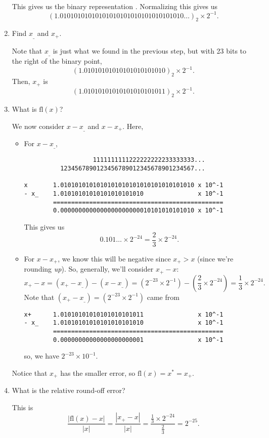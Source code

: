 \documentclass[letterpaper]{article}
\begin{document}
\begin{mdframed}
\begin{enumerate}[(1)]
\begin{mdframed}
\[\begin{aligned}
            \end{aligned}\]
            This gives us the binary representation . Normalizing this gives us 
            \[(1.01010101010101010101010101010101010\hdots)_2 \times 2^{-1}.\]
        \end{mdframed}
        \item Find $x_\_$ and $x_+$.
        \begin{mdframed}
            Note that $x_\_$ is just what we found in the previous step, but with 23 bits to the right of the binary point,
            \[(1.01010101010101010101010)_2 \times 2^{-1}.\]
            Then, $x_+$ is 
            \[(1.01010101010101010101011)_2 \times 2^{-1}.\] 
        \end{mdframed}
        \item What is $\text{fl}(x)$?
        \begin{mdframed}
            We now consider $x - x_\_$ and $x - x_+$. Here, 
            \begin{itemize}
                \item For $x - x_\_$, 
                \begin{verbatim}
                   1111111111222222222233333333...
          1234567890123456789012345678901234567...

x       1.0101010101010101010101010101010101010 x 10^-1
- x_    1.01010101010101010101010               x 10^-1
        ===============================================
        0.0000000000000000000000010101010101010 x 10^-1\end{verbatim}
                This gives us \[0.101\hdots \times 2^{-24} = \frac{2}{3} \times 2^{-24}.\]
                    
                \item For $x - x_+$, we know this will be negative since $x_+ > x$ (since we're rounding \emph{up}). So, generally, we'll consider $x_+ - x$: 
                \[x_+ - x = (x_+ - x_\_) - (x - x_\_) = \left(2^{-23} \times 2^{-1}\right) - \left(\frac{2}{3} \times 2^{-24}\right) = \frac{1}{3} \times 2^{-24}.\]
                Note that $(x_+ - x_\_) = \left(2^{-23} \times 2^{-1}\right)$ came from 
                \begin{verbatim}
x+      1.01010101010101010101011               x 10^-1
- x_    1.01010101010101010101010               x 10^-1
        ===============================================
        0.00000000000000000000001               x 10^-1\end{verbatim}
                so, we have $2^{-23} \times 10^{-1}$. 
            \end{itemize}
            Notice that $x_{+}$ has the smaller error, so $\text{fl}(x) = x^* = x_{+}$. 
        \end{mdframed}
        \item What is the relative round-off error?  
        \begin{mdframed}
            This is 
            \[\frac{|\text{fl}(x) - x|}{|x|} = \frac{|x_+ - x|}{|x|} = \frac{\frac{1}{3} \times 2^{-24}}{\frac{2}{3}} = 2^{-25}.\]


\end{mdframed}
\end{enumerate}
\end{mdframed}
\end{document}
